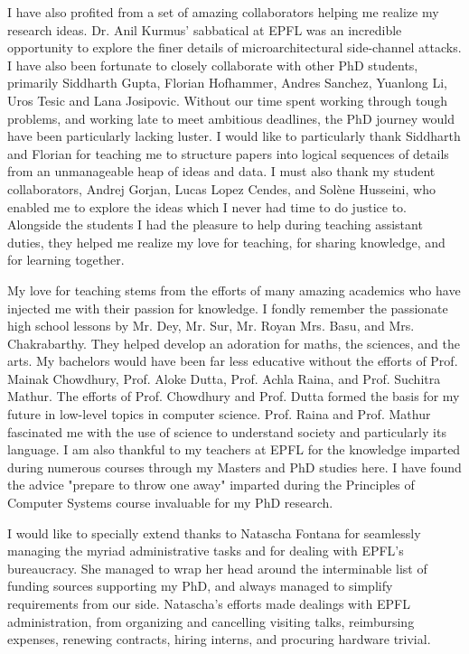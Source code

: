 I have also profited from a set of amazing collaborators helping me realize my
research ideas. 
Dr. Anil Kurmus' sabbatical at EPFL was an incredible opportunity to explore the
finer details of microarchitectural side-channel attacks.
I have also been fortunate to closely collaborate with other PhD students,
primarily Siddharth Gupta, Florian Hofhammer, Andres Sanchez, Yuanlong Li,
Uros Tesic and Lana Josipovic. 
Without our time spent working through tough problems, and working late to meet
ambitious deadlines, the PhD journey would have been particularly lacking luster.
I would like to particularly thank Siddharth and Florian for teaching me to
structure papers into logical sequences of details from an unmanageable heap of
ideas and data.
I must also thank my student collaborators, Andrej Gorjan, Lucas Lopez Cendes, 
and Solène Husseini, who enabled me to 
explore the ideas which I never had time to do justice to. 
Alongside the students I had the pleasure to help during teaching assistant
duties, they helped me realize my love for teaching, for sharing knowledge,
and for learning together.

My love for teaching stems from the efforts of many amazing academics
who have injected me with their passion for knowledge.
I fondly remember the passionate high school lessons by 
Mr. Dey, Mr. Sur, Mr. Royan Mrs. Basu, and Mrs. Chakrabarthy.
They helped develop an adoration for maths, the sciences, and the arts.
My bachelors would have been far less educative without the efforts 
of Prof. Mainak Chowdhury, Prof. Aloke Dutta, Prof. Achla Raina,
and Prof. Suchitra Mathur.
The efforts of Prof. Chowdhury and Prof. Dutta formed the basis for my
future in low-level topics in computer science. 
Prof. Raina and Prof. Mathur fascinated me with the use of science to
understand society and particularly its language.
I am also thankful to my teachers at EPFL for the knowledge imparted during
numerous courses through my Masters and PhD studies here.
I have found the advice "prepare to throw one away" imparted during the
Principles of Computer Systems course invaluable for my PhD research.

I would like to specially extend thanks to Natascha Fontana for seamlessly 
managing the myriad administrative tasks and for dealing with EPFL's bureaucracy.
She managed to wrap her head around the interminable list of funding sources
supporting my PhD, and always managed to simplify requirements from our side.
Natascha's efforts made dealings with EPFL administration, from organizing and
cancelling visiting talks, reimbursing expenses, renewing contracts, 
hiring interns, and procuring hardware trivial.

